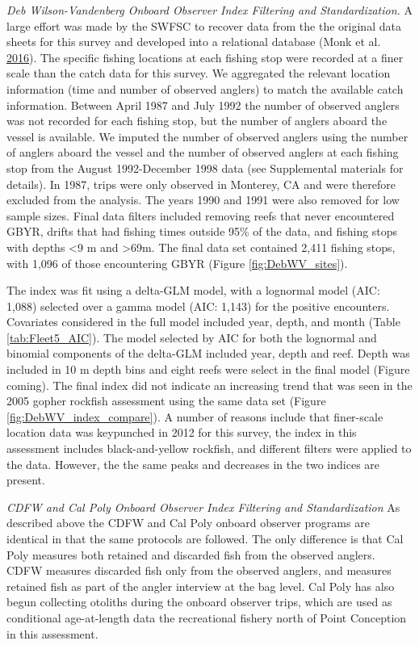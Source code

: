 \documentclass[12pt,]{article}
\begin{document}
\emph{Deb Wilson-Vandenberg Onboard Observer Index Filtering and
Standardization.} A large effort was made by the SWFSC to recover data
from the the original data sheets for this survey and developed into a
relational database (Monk et al.
\protect\hyperlink{ref-Monk2016}{2016}). The specific fishing locations
at each fishing stop were recorded at a finer scale than the catch data
for this survey. We aggregated the relevant location information (time
and number of observed anglers) to match the available catch
information. Between April 1987 and July 1992 the number of observed
anglers was not recorded for each fishing stop, but the number of
anglers aboard the vessel is available. We imputed the number of
observed anglers using the number of anglers aboard the vessel and the
number of observed anglers at each fishing stop from the August
1992-December 1998 data (see Supplemental materials for details). In
1987, trips were only observed in Monterey, CA and were therefore
excluded from the analysis. The years 1990 and 1991 were also removed
for low sample sizes. Final data filters included removing reefs that
never encountered GBYR, drifts that had fishing times outside 95\% of
the data, and fishing stops with depths \textless{}9 m and
\textgreater{}69m. The final data set contained 2,411 fishing stops,
with 1,096 of those encountering GBYR (Figure \ref{fig:DebWV_sites}).

The index was fit using a delta-GLM model, with a lognormal model (AIC:
1,088) selected over a gamma model (AIC: 1,143) for the positive
encounters. Covariates considered in the full model included year,
depth, and month (Table \ref{tab:Fleet5_AIC}). The model selected by AIC
for both the lognormal and binomial components of the delta-GLM included
year, depth and reef. Depth was included in 10 m depth bins and eight
reefs were select in the final model (Figure coming). The final index
did not indicate an increasing trend that was seen in the 2005 gopher
rockfish assessment using the same data set (Figure
\ref{fig:DebWV_index_compare}). A number of reasons include that
finer-scale location data was keypunched in 2012 for this survey, the
index in this assessment includes black-and-yellow rockfish, and
different filters were applied to the data. However, the the same peaks
and decreases in the two indices are present.

\emph{CDFW and Cal Poly Onboard Observer Index Filtering and
Standardization} As described above the CDFW and Cal Poly onboard
observer programs are identical in that the same protocols are followed.
The only difference is that Cal Poly measures both retained and
discarded fish from the observed anglers. CDFW measures discarded fish
only from the observed anglers, and measures retained fish as part of
the angler interview at the bag level. Cal Poly has also begun
collecting otoliths during the onboard observer trips, which are used as
conditional age-at-length data the recreational fishery north of Point
Conception in this assessment.
\end{document}
